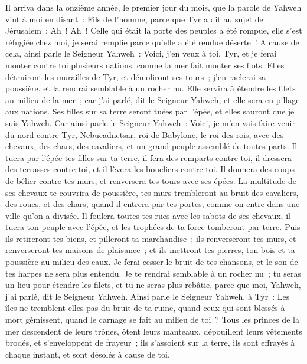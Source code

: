 \begin{multicols}{2}
\VerseOne{}Il arriva dans la onzième année, le premier jour du mois, que la parole de Yahweh vint à moi en disant~:
Fils de l'homme, parce que Tyr a dit au sujet de Jérusalem~: Ah~! Ah~! Celle qui était la porte des peuples a été rompue, elle s'est réfugiée chez moi, je serai remplie parce qu'elle a été rendue déserte~!
A cause de cela, ainsi parle le Seigneur Yahweh~: Voici, j'en veux à toi, Tyr, et je ferai monter contre toi plusieurs nations, comme la mer fait monter ses flots.
Elles détruiront les murailles de Tyr, et démoliront ses tours~; j'en raclerai sa poussière, et la rendrai semblable à un rocher nu.
Elle servira à étendre les filets au milieu de la mer~; car j'ai parlé, dit le Seigneur Yahweh, et elle sera en pillage aux nations.
Ses filles sur sa terre seront tuées par l'épée, et elles sauront que je suis Yahweh.
Car ainsi parle le Seigneur Yahweh~: Voici, je m'en vais faire venir du nord contre Tyr, Nebucadnetsar, roi de Babylone, le roi des rois, avec des chevaux, des chars, des cavaliers, et un grand peuple assemblé de toutes parts.
Il tuera par l'épée tes filles sur ta terre, il fera des remparts contre toi, il dressera des terrasses contre toi, et il lèvera les boucliers contre toi.
Il donnera des coups de bélier contre tes murs, et renversera tes tours avec ses épées.
La multitude de ses chevaux te couvrira de poussière, tes murs trembleront au bruit des cavaliers, des roues, et des chars, quand il entrera par tes portes, comme on entre dans une ville qu'on a divisée.
Il foulera toutes tes rues avec les sabots de ses chevaux, il tuera ton peuple avec l'épée, et les trophées de ta force tomberont par terre.
Puis ils retireront tes biens, et pilleront ta marchandise~; ils renverseront tes murs, et renverseront tes maisons de plaisance~; et ils mettront tes pierres, ton bois et ta poussière au milieu des eaux.
Je ferai cesser le bruit de tes chansons, et le son de tes harpes ne sera plus entendu.
Je te rendrai semblable à un rocher nu~; tu seras un lieu pour étendre les filets, et tu ne seras plus rebâtie, parce que moi, Yahweh, j'ai parlé, dit le Seigneur Yahweh.
Ainsi parle le Seigneur Yahweh, à Tyr~: Les îles ne tremblent-elles pas du bruit de ta ruine, quand ceux qui sont blessés à mort gémissent, quand le carnage se fait au milieu de toi~?
Tous les princes de la mer descendent de leurs trônes, ôtent leurs manteaux, dépouillent leurs vêtements brodés, et s'enveloppent de frayeur~; ils s'assoient sur la terre, ils sont effrayés à chaque instant, et sont désolés à cause de toi.

\end{multicols}
